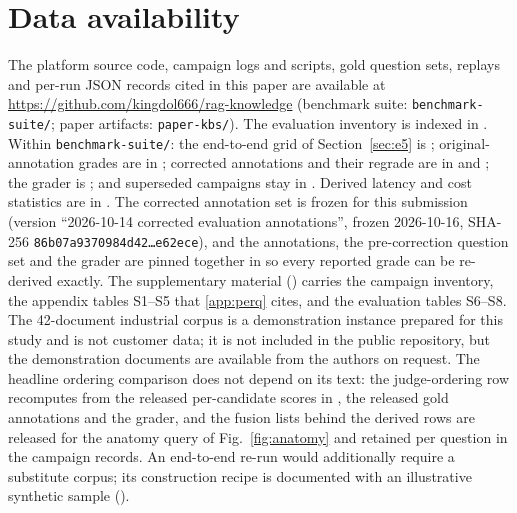 \section*{Data availability}
The platform source code, campaign logs and scripts, gold question sets,
replays and per-run JSON records cited in this paper are available at
\url{https://github.com/kingdol666/rag-knowledge} (benchmark suite:
\texttt{benchmark-suite/}; paper artifacts: \texttt{paper-kbs/}). The
evaluation inventory is indexed in . Within
\texttt{benchmark-suite/}: the end-to-end grid of Section~\ref{sec:e5} is
; original-annotation grades
are in ; corrected
annotations and their regrade are in
 and
; the grader is
; and superseded campaigns stay in
. Derived latency and cost statistics are in
. The corrected annotation set
is frozen for this submission (version ``2026-10-14 corrected evaluation
annotations'', frozen 2026-10-16, SHA-256
\texttt{86b07a9370984d42\ldots e62ece}), and the annotations, the
pre-correction question set and the grader are pinned together in
 so every
reported grade can be re-derived exactly. The supplementary material
() carries the
campaign inventory, the appendix tables S1--S5 that
\ref{app:perq} cites, and the evaluation tables S6--S8. The 42-document industrial corpus is a demonstration
instance prepared for this study and is not customer data; it is not included
in the public repository, but the demonstration documents are available from
the authors on request. The headline ordering comparison does not depend on
its text: the judge-ordering row recomputes from the
released per-candidate scores in
, the released gold
annotations and the grader, and the fusion lists behind the derived rows are
released for the anatomy query of Fig.~\ref{fig:anatomy} and retained per
question in the campaign records. An end-to-end re-run would additionally
require a substitute corpus; its construction recipe is documented with an
illustrative synthetic sample
().

